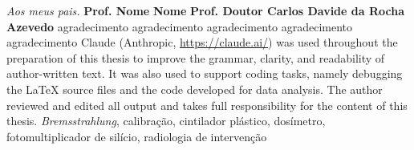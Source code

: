 \documentclass[11pt,twoside,a4paper]{report}
\begin{document}
\TitlePage
  \vspace*{55mm}
  \TEXT{}
       {\hfill\textit{Aos meus pais.}}
\EndTitlePage
\TitlePage
  \vspace*{55mm}
       {\textbf{Prof. Nome}
       }
  \vspace*{5mm}
       {\textbf{Nome}}
 \vspace*{5mm}
       {\textbf{Prof. Doutor Carlos Davide da Rocha Azevedo}}
\EndTitlePage
\TitlePage
  \vspace*{55mm}
       {}
  \TEXT{}
       {agradecimento}
        \TEXT{}
       {}
       \TEXT{}
       {agradecimento}
        \TEXT{}
       {}
       \TEXT{}
       {agradecimento}
        \TEXT{}
       {}
        \TEXT{}
       {agradecimento}
        \TEXT{}
       {}
         \TEXT{}
       {agradecimento}
\EndTitlePage
\TitlePage
  \vspace*{55mm}
       {Claude (Anthropic, \url{https://claude.ai/}) was used throughout the preparation of this thesis to improve the grammar, clarity, and readability of author-written text. It was also used to support coding tasks, namely debugging the \LaTeX{} source files and the code developed for data analysis. The author reviewed and edited all output and takes full responsibility for the content of this thesis.}
\EndTitlePage
\TitlePage
  \vspace*{35mm}
      {\emph{Bremsstrahlung}, calibração, cintilador plástico, dosímetro, fotomultiplicador de silício, radiologia de intervenção}
 \vspace*{15mm}
\end{document}
